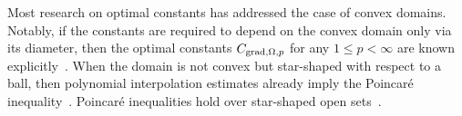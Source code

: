 \documentclass[10pt,a4paper]{article}
\begin{document}
Most research on optimal constants has addressed the case of convex domains. 
Notably, if the constants are required to depend on the convex domain only via its diameter, 
then the optimal constants $C_{\operatorname{grad},\Omega,p}$ for any $1 \leq p < \infty$ are known explicitly~\cite{bebendorf2003note,acosta2004optimal,esposito2013poincare,ferone2012remark}.
When the domain is not convex but star-shaped with respect to a ball,
then polynomial interpolation estimates already imply the Poincar\'e inequality~\cite{brenner2008mathematical,ern2021finite}. 
Poincar\'e inequalities hold over star-shaped open sets~\cite[Theorem~3.1]{hurri1988poincare}. %
\end{document}
